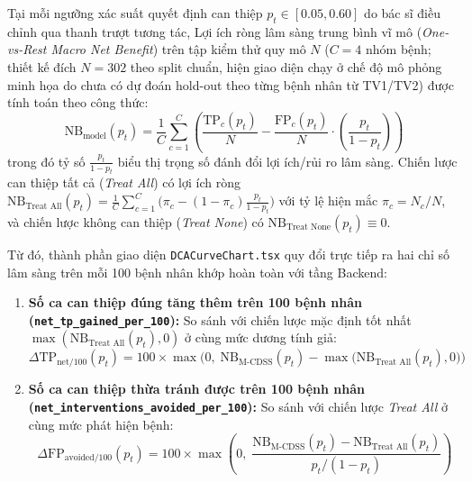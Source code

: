Tại mỗi ngưỡng xác suất quyết định can thiệp $p_t \in [0.05, 0.60]$ do bác sĩ điều chỉnh qua thanh trượt tương tác, Lợi ích ròng lâm sàng trung bình vĩ mô (\textit{One-vs-Rest Macro Net Benefit}) trên tập kiểm thử quy mô $N$ ($C = 4$ nhóm bệnh; thiết kế đích $N = 302$ theo split chuẩn, hiện giao diện chạy ở chế độ mô phỏng minh họa do chưa có dự đoán hold-out theo từng bệnh nhân từ TV1/TV2) được tính toán theo công thức:
\begin{equation}
    \text{NB}_{\text{model}}(p_t) = \frac{1}{C} \sum_{c=1}^{C} \left( \frac{\text{TP}_c(p_t)}{N} - \frac{\text{FP}_c(p_t)}{N} \cdot \left(\frac{p_t}{1 - p_t}\right) \right)
\end{equation}
trong đó tỷ số $\frac{p_t}{1 - p_t}$ biểu thị trọng số đánh đổi lợi ích/rủi ro lâm sàng. Chiến lược can thiệp tất cả (\textit{Treat All}) có lợi ích ròng $\text{NB}_{\text{Treat All}}(p_t) = \frac{1}{C}\sum_{c=1}^{C}\big(\pi_c - (1 - \pi_c)\frac{p_t}{1 - p_t}\big)$ với tỷ lệ hiện mắc $\pi_c = N_c / N$, và chiến lược không can thiệp (\textit{Treat None}) có $\text{NB}_{\text{Treat None}}(p_t) \equiv 0$.

Từ đó, thành phần giao diện \texttt{DCACurveChart.tsx} quy đổi trực tiếp ra hai chỉ số lâm sàng trên mỗi 100 bệnh nhân khớp hoàn toàn với tầng Backend:
\begin{enumerate}[leftmargin=1.8em, itemsep=0.2em]
    \item \textbf{Số ca can thiệp đúng tăng thêm trên 100 bệnh nhân (\texttt{net\_tp\_gained\_per\_100}):} So sánh với chiến lược mặc định tốt nhất $\max(\text{NB}_{\text{Treat All}}(p_t), 0)$ ở cùng mức dương tính giả:
    \begin{equation}
        \Delta \text{TP}_{\text{net}/100}(p_t) = 100 \times \max\!\Big(0,\; \text{NB}_{\text{M-CDSS}}(p_t) - \max\big(\text{NB}_{\text{Treat All}}(p_t), 0\big)\Big)
    \end{equation}
    \item \textbf{Số ca can thiệp thừa tránh được trên 100 bệnh nhân (\texttt{net\_interventions\_avoided\_per\_100}):} So sánh với chiến lược \textit{Treat All} ở cùng mức phát hiện bệnh:
    \begin{equation}
        \Delta \text{FP}_{\text{avoided}/100}(p_t) = 100 \times \max\!\left(0,\; \frac{\text{NB}_{\text{M-CDSS}}(p_t) - \text{NB}_{\text{Treat All}}(p_t)}{p_t / (1 - p_t)}\right)
    \end{equation}
\end{enumerate}

